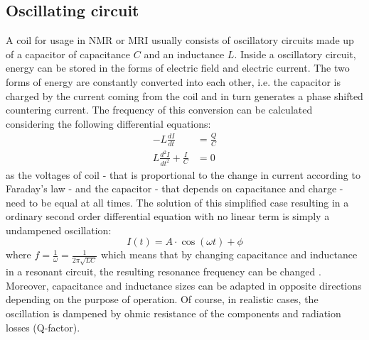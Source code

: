             \subsection{Oscillating circuit}
                A coil for usage in NMR or MRI usually consists of oscillatory circuits made up of a capacitor of capacitance $C$ and an inductance $L$. Inside a oscillatory circuit, energy can be stored in the forms of electric field and electric current. The two forms of energy are constantly converted into each other, i.e. the capacitor is charged by the current coming from the coil and in turn generates a phase shifted countering current. The frequency of this conversion can be calculated considering the following differential equations:
                \begin{equation}
                    \begin{aligned}
                        -L\frac{dI}{dt} &= \frac{Q}{C} \\
                        L\frac{d^2I}{dt^2} + \frac{I}{C} &= 0
                    \end{aligned}
                \end{equation}
                as the voltages of coil - that is proportional to the change in current according to Faraday's law - and the capacitor - that depends on capacitance and charge - need to be equal at all times. The solution of this simplified case resulting in a ordinary second order differential equation with no linear term is simply a undampened oscillation:
                \begin{equation}
                    I(t) =  A \cdot \cos(\omega t) + \phi 
                \end{equation}
                where $f= \frac{1}{\omega} = \frac{1}{2\pi\sqrt{LC}}$ which means that by changing capacitance and inductance in a resonant circuit, the resulting resonance frequency can be changed \cite{rao_electronic_2011}. Moreover, capacitance and inductance sizes can be adapted in opposite directions depending on the purpose of operation.
                Of course, in realistic cases, the oscillation is dampened by ohmic resistance of the components and radiation losses (Q-factor).
